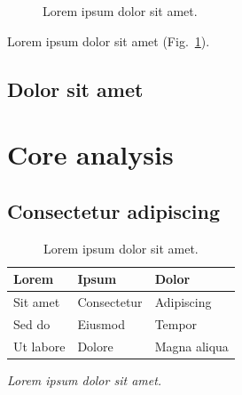 \documentclass[11pt]{article}
\begin{document}
\lipsum[3]

\begin{figure}[tbp]
  \centering
  \caption{Lorem ipsum dolor sit amet.}
  \label{fig:example}
\end{figure}

Lorem ipsum dolor sit amet (Fig.~\ref{fig:example}).

\subsection{Dolor sit amet}

\lipsum[4]

\section{Core analysis}

\subsection{Consectetur adipiscing}

\lipsum[5]

\begin{table}[tbp]
  \centering
  \caption{Lorem ipsum dolor sit amet.}
  \label{tab:example}
  \small
  \begin{tabularx}{\linewidth}{@{}
    >{\raggedright\arraybackslash}X
    >{\raggedright\arraybackslash}X
    >{\raggedright\arraybackslash}X@{}}
    \toprule
    \textbf{Lorem} & \textbf{Ipsum} & \textbf{Dolor} \\
    \midrule
    Sit amet & Consectetur & Adipiscing \\
    Sed do & Eiusmod & Tempor \\
    Ut labore & Dolore & Magna aliqua \\
    \bottomrule
  \end{tabularx}
  \par\smallskip
  {\scriptsize\textit{Lorem ipsum dolor sit amet.}\par}
\end{table}
\end{document}
